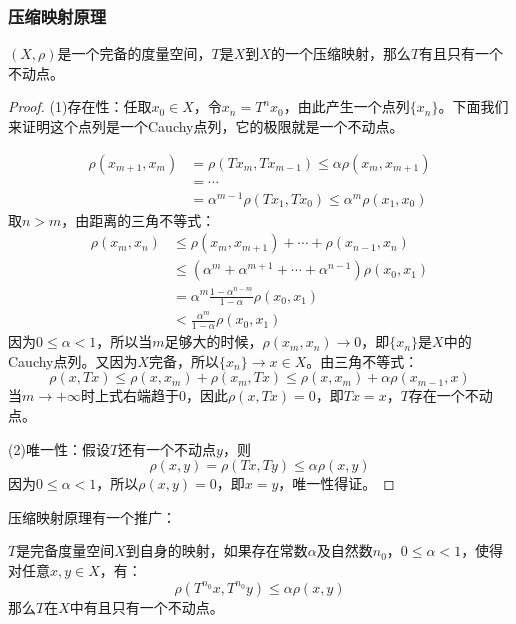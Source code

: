 \subsubsection{压缩映射原理}
\begin{theorem}
	$(X,\rho)$是一个完备的度量空间，$T$是$X$到$X$的一个压缩映射，那么$T$有且只有一个不动点。
\end{theorem}
\begin{proof}
	(1)存在性：任取$x_0\in X$，令$x_n=T^nx_0$，由此产生一个点列$\{x_n\}$。下面我们来证明这个点列是一个Cauchy点列，它的极限就是一个不动点。\par
	\begin{align*}
		\rho(x_{m+1},x_m)&=\rho(Tx_m,Tx_{m-1})\leqslant\alpha\rho(x_m,x_{m+1}) \\
		&=\cdots \\
		&=\alpha^{m-1}\rho(Tx_1,Tx_0)\leqslant\alpha^m\rho(x_1,x_0)
	\end{align*}
	取$n>m$，由距离的三角不等式：
	\begin{align*}
		\rho(x_m,x_n)
		&\leqslant\rho(x_m,x_{m+1})+\cdots+\rho(x_{n-1},x_n) \\
		&\leqslant(\alpha^m+\alpha^{m+1}+\cdots+\alpha^{n-1})\rho(x_0,x_1) \\
		&=\alpha^m\frac{1-\alpha^{n-m}}{1-\alpha}\rho(x_0,x_1) \\
		&<\frac{\alpha^m}{1-\alpha}\rho(x_0,x_1)
	\end{align*}
	因为$0\leqslant\alpha<1$，所以当$m$足够大的时候，$\rho(x_m,x_n)\rightarrow 0$，即$\{x_n\}$是$X$中的Cauchy点列。又因为$X$完备，所以$\{x_n\}\rightarrow x\in X$。由三角不等式：
	\begin{equation*}
		\rho(x,Tx)\leqslant\rho(x,x_m)+\rho(x_m,Tx)\leqslant\rho(x,x_m)+\alpha\rho(x_{m-1},x)
	\end{equation*}
	当$m\to+\infty$时上式右端趋于0，因此$\rho(x,Tx)=0$，即$Tx=x$，$T$存在一个不动点。\par
	(2)唯一性：假设$T$还有一个不动点$y$，则
	\begin{equation*}
		\rho(x,y)=\rho(Tx,Ty)\leqslant\alpha\rho(x,y)
	\end{equation*}
	因为$0\leqslant\alpha<1$，所以$\rho(x,y)=0$，即$x=y$，唯一性得证。
\end{proof}
压缩映射原理有一个推广：
\begin{theorem}
	$T$是完备度量空间$X$到自身的映射，如果存在常数$\alpha$及自然数$n_0$，$0\leqslant\alpha<1$，使得对任意$x,y\in X$，有：
	\begin{equation*}
		\rho(T^{n_0}x,T^{n_0}y)\leqslant\alpha\rho(x,y)
	\end{equation*}
	那么$T$在$X$中有且只有一个不动点。
\end{theorem}

